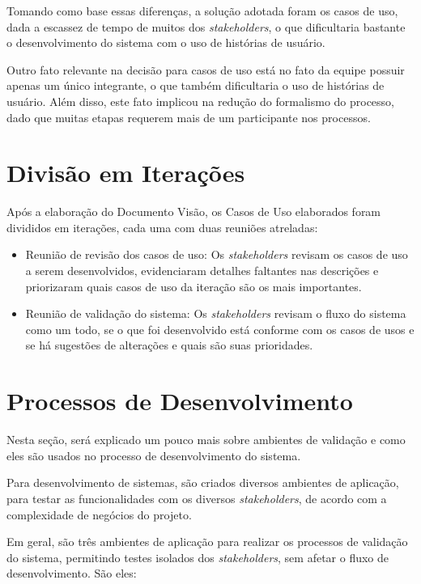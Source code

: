 Tomando como base essas diferenças, a solução adotada foram os casos de uso, dada a escassez de tempo de muitos dos \textit{stakeholders}, o que dificultaria bastante o desenvolvimento do sistema com o uso de histórias de usuário.

Outro fato relevante na decisão para casos de uso está no fato da equipe possuir apenas um único integrante, o que também dificultaria o uso de histórias de usuário. Além disso, este fato implicou na redução do formalismo do processo, dado que muitas etapas requerem mais de um participante nos processos.

\section{Divisão em Iterações}
Após a elaboração do Documento Visão, os Casos de Uso elaborados foram divididos em iterações, cada uma com duas reuniões atreladas:

\begin{itemize}
    \item Reunião de revisão dos casos de uso: Os \textit{stakeholders} revisam os casos de uso a serem desenvolvidos, evidenciaram detalhes faltantes nas descrições e priorizaram quais casos de uso da iteração são os mais importantes.
    \item Reunião de validação do sistema: Os \textit{stakeholders} revisam o fluxo do sistema como um todo, se o que foi desenvolvido está conforme com os casos de usos e se há sugestões de alterações e quais são suas prioridades.
\end{itemize}

\section{Processos de Desenvolvimento}
Nesta seção, será explicado um pouco mais sobre ambientes de validação e como eles são usados no processo de desenvolvimento do sistema.

Para desenvolvimento de sistemas, são criados diversos ambientes de aplicação, para testar as funcionalidades com os diversos \textit{stakeholders}, de acordo com a complexidade de negócios do projeto.

Em geral, são três ambientes de aplicação para realizar os processos de validação do sistema, permitindo testes isolados dos \textit{stakeholders}, sem afetar o fluxo de desenvolvimento. São eles\cite{tracyragan2017}:

